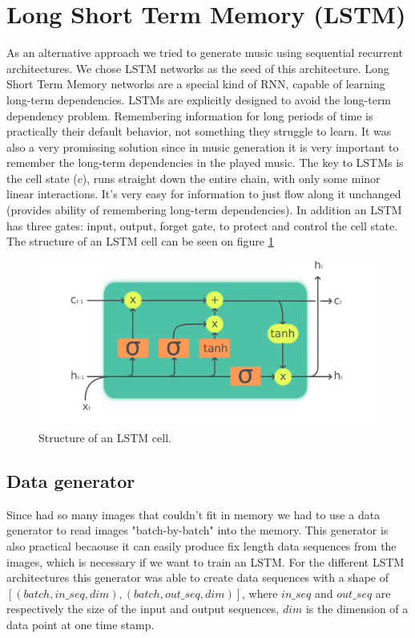 \documentclass{article}
\begin{document}


\section{Long Short Term Memory (LSTM)}

As an alternative approach we tried to generate music using sequential recurrent architectures. We chose LSTM networks as the seed of this architecture. Long Short Term Memory networks are a special kind of RNN, capable of learning long-term dependencies. 
LSTMs are explicitly designed to avoid the long-term dependency problem. Remembering information for long periods of time is practically their default behavior, not something they struggle to learn. It was also a very promissing solution since in music generation it is very important to remember the long-term dependencies in the played music. The key to LSTMs is the cell state ($c$), runs straight down the entire chain, with only some minor linear interactions. It’s very easy for information to just flow along it unchanged (provides ability of remembering long-term dependencies). In addition an LSTM has three gates: input, output, forget gate, to protect and control the cell state. The structure of an LSTM cell can be seen on figure \ref{fig:lstmcell}

\begin{figure}[!htb]
	\centering
	\includegraphics[width=\linewidth]{LSTMcell.png}
	\caption{Structure of an LSTM cell.}
	\label{fig:lstmcell}
\end{figure}

\subsection{Data generator}

Since had so many images that couldn't fit in memory we had to use a data generator to read images "batch-by-batch" into the memory. This generator is also practical becaouse it can easily produce fix length data sequences from the images, which is necessary if we want to train an LSTM. For the different LSTM architectures this generator was able to create data sequences with a shape of $[(batch, in\_seq, dim), (batch, out\_seq, dim)]$, where $in\_seq$ and $out\_seq$ are respectively the size of the input and output sequences, $dim$ is the dimension of a data point at one time stamp.  
\end{document}
